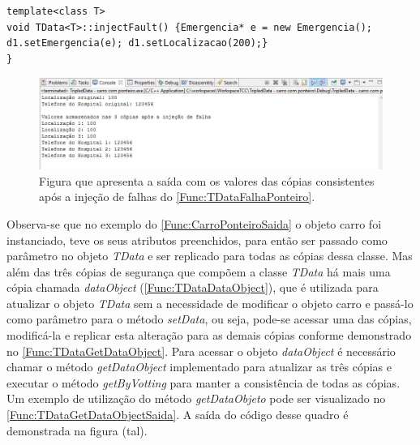 \begin{lstlisting}[label=Func:TDataFalhaPonteiro,caption={[Método utilizado para simular uma falha na localização do carro.]Método utilizado para injeção de falhas. Este método pode ser implementado dentro da classe TData para simular um bit-flip.}]
template<class T>
void TData<T>::injectFault() {Emergencia* e = new Emergencia(); d1.setEmergencia(e); d1.setLocalizacao(200);}
}
\end{lstlisting}

\begin{figure}[H]
	\centering
	\includegraphics[width=1.0\textwidth]{figuras/tdataPonteiro.jpg}
	\caption[Figura que apresenta a saída com os valores das cópias consistentes após a injeção de falhas do \autoref{Func:TDataFalhaPonteiro}.]{Figura que apresenta a saída com os valores das cópias consistentes após a injeção de falhas do \autoref{Func:TDataFalhaPonteiro}.}
	\label{Img:tdataPonteiro}	
\end{figure}

Observa-se que no exemplo do \autoref{Func:CarroPonteiroSaida} o objeto carro foi instanciado, teve os seus atributos preenchidos, para então ser passado como parâmetro no objeto \textit{TData} e ser replicado para todas as cópias dessa classe. Mas além das três cópias de segurança que compõem a classe \textit{TData} há mais uma cópia chamada \textit{dataObject} (\autoref{Func:TDataDataObject}), que é utilizada para atualizar o objeto \textit{TData} sem a necessidade de modificar o objeto carro e passá-lo como parâmetro para o método \textit{setData}, ou seja, pode-se acessar uma das cópias, modificá-la e replicar esta alteração para as demais cópias conforme demonstrado no \autoref{Func:TDataGetDataObject}. Para acessar o objeto \textit{dataObject}  é necessário chamar o método \textit{getDataObject} implementado para atualizar as três cópias e executar o método \textit{getByVotting} para manter a consistência de todas as cópias. Um exemplo de utilização do método \textit{getDataObjeto} pode ser visualizado no \autoref{Func:TDataGetDataObjectSaida}. A saída do código desse quadro é demonstrada na figura (tal).

